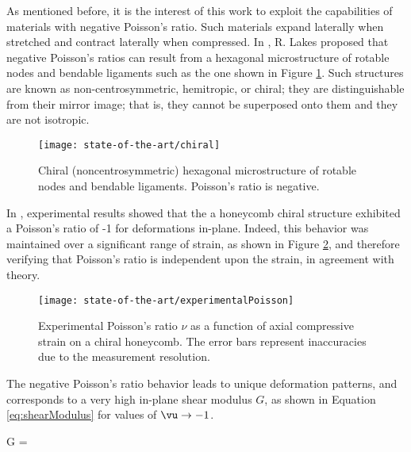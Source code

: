   As mentioned before, it is the interest of this work to exploit the capabilities of materials with negative Poisson's ratio. Such materials expand laterally when stretched and contract laterally when compressed. In \cite{Lakes1991}, R. Lakes proposed that negative Poisson's ratios can result from a hexagonal microstructure of rotable nodes and bendable ligaments such as the one shown in Figure \ref{fig:chiral}. Such structures are known as non-centrosymmetric, hemitropic, or chiral; they are distinguishable from their mirror image; that is, they cannot be superposed onto them and they are not isotropic.

  \begin{figure}[!htpb]
    \centering
    \texttt{[image: state-of-the-art/chiral]}
    \caption[Chiral structure of rotable nodes and bendable ligaments]{Chiral (noncentrosymmetric) hexagonal microstructure of rotable nodes and bendable ligaments. Poisson's ratio is negative. \cite{Lakes1991}}\label{fig:chiral}
  \end{figure}

  In \cite{Prall1997}, experimental results showed that the a honeycomb chiral structure exhibited a Poisson's ratio of -1 for deformations in-plane. Indeed, this behavior was maintained over a significant range of strain, as shown in Figure \ref{fig:experimentalPoisson}, and therefore verifying that Poisson's ratio is independent upon the strain, in agreement with theory. 

  \begin{figure}[!htpb]
    \centering
    \texttt{[image: state-of-the-art/experimentalPoisson]}
    \caption[Experimental Poisson's ratio $v$ as a function of axial compressive strain on a chiral honeycomb]{Experimental Poisson's ratio $\nu$ as a function of axial compressive strain on a chiral honeycomb. The error bars represent inaccuracies due to the measurement resolution. \cite{Prall1997}}\label{fig:experimentalPoisson}
  \end{figure}

  The negative Poisson’s ratio behavior leads to unique deformation patterns, and corresponds to a very high in-plane shear modulus $G$, as shown in Equation \ref{eq:shearModulus} for values of $\vu \to -1$.

  \begin{eqution}\label{eq:shearModulus}
    G = 
  \end{eqution}

